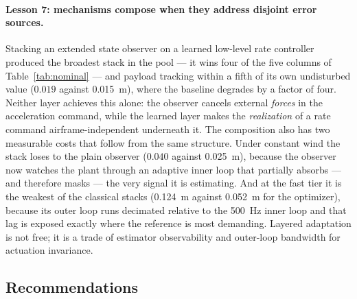 \paragraph{Lesson 7: mechanisms compose when they address disjoint error sources.}
Stacking an extended state observer on a learned low-level rate controller produced the
broadest stack in the pool --- it wins four of the five columns of
Table~\ref{tab:nominal} --- and payload tracking within a fifth of its own undisturbed
value ($0.019$ against \SI{0.015}{\meter}), where the baseline degrades by a factor of
four. Neither layer achieves this alone: the observer cancels external \emph{forces} in
the acceleration command, while the learned layer makes the \emph{realization} of a rate
command airframe-independent underneath it. The composition also has two measurable costs
that follow from the same structure. Under constant wind the stack loses to the plain
observer ($0.040$ against \SI{0.025}{\meter}), because the observer now watches the plant
through an adaptive inner loop that partially absorbs --- and therefore masks --- the very
signal it is estimating. And at the fast tier it is the weakest of the classical stacks
(\SI{0.124}{\meter} against \SI{0.052}{\meter} for the optimizer), because its outer loop
runs decimated relative to the \SI{500}{\hertz} inner loop and that lag is exposed exactly
where the reference is most demanding. Layered adaptation is not free; it is a trade of
estimator observability and outer-loop bandwidth for actuation invariance.

\subsection{Recommendations}
\label{sec:results:recommendations}

